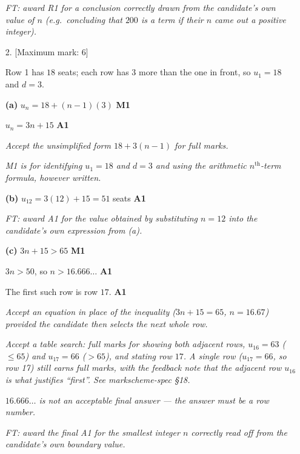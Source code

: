\documentclass[12pt, twoside]{article}
\begin{document}
\begin{enumerate}[itemsep=0.3cm]
\emph{FT: award R1 for a conclusion correctly drawn from the
candidate's own value of $n$ (e.g.\ concluding that $200$ \emph{is} a
term if their $n$ came out a positive integer).}

\newpage

\item[2.] [Maximum mark: 6]

Row 1 has $18$ seats; each row has $3$ more than the one in front,
so $u_{1} = 18$ and $d = 3$.

\medskip

\textbf{(a)} $u_{n} = 18 + (n - 1)(3)$ \hfill \textbf{M1}

$u_{n} = 3n + 15$ \hfill \textbf{A1}

\emph{Accept the unsimplified form $18 + 3(n-1)$ for full marks.}

\emph{M1 is for identifying $u_{1} = 18$ and $d = 3$ and using the
arithmetic $n^{\text{th}}$-term formula, however written.}

\medskip

\textbf{(b)} $u_{12} = 3(12) + 15 = 51$ seats \hfill \textbf{A1}

\emph{FT: award A1 for the value obtained by substituting $n = 12$
into the candidate's own expression from (a).}

\medskip

\textbf{(c)} $3n + 15 > 65$ \hfill \textbf{M1}

$3n > 50$, so $n > 16.666\ldots$ \hfill \textbf{A1}

The first such row is row $17$. \hfill \textbf{A1}

\emph{Accept an equation in place of the inequality
($3n + 15 = 65$, $n = 16.67$) provided the candidate then selects the
next whole row.}

\emph{Accept a table search: full marks for showing both adjacent
rows, $u_{16} = 63$ ($\le 65$) and $u_{17} = 66$ ($> 65$), and stating
row $17$. A single row ($u_{17} = 66$, so row 17) still earns full
marks, with the feedback note that the adjacent row $u_{16}$ is what
justifies ``first''. See markscheme-spec §18.}

\emph{$16.666\ldots$ is not an acceptable final answer --- the answer
must be a row number.}

\emph{FT: award the final A1 for the smallest integer $n$ correctly
read off from the candidate's own boundary value.}

\end{enumerate}
\end{document}
